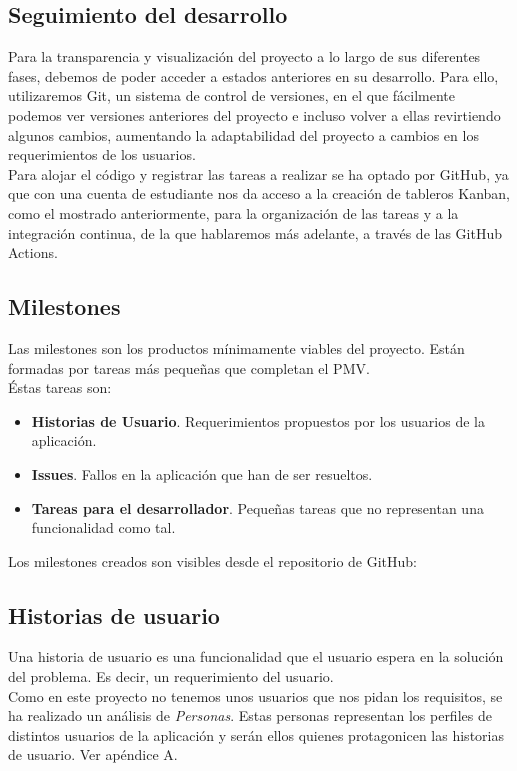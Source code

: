 \subsection{Seguimiento del desarrollo}
Para la transparencia y visualización del proyecto a lo largo de sus diferentes fases, debemos de poder acceder a estados anteriores en su desarrollo. Para ello, utilizaremos Git, un sistema de control de versiones, en el que fácilmente podemos ver versiones anteriores del proyecto e incluso volver a ellas revirtiendo algunos cambios, aumentando la adaptabilidad del proyecto a cambios en los requerimientos de los usuarios.\\

Para alojar el código y registrar las tareas a realizar se ha optado por GitHub, ya que con una cuenta de estudiante nos da acceso a la creación de tableros Kanban, como el mostrado anteriormente, para la organización de las tareas y a la integración continua, de la que hablaremos más adelante, a través de las GitHub Actions.

\subsection{Milestones}
Las milestones son los productos mínimamente viables del proyecto. Están formadas por tareas más pequeñas que completan el PMV.\\

Éstas tareas son:
\begin{itemize}
    \item \textbf{Historias de Usuario}. Requerimientos propuestos por los usuarios de la aplicación.
    \item \textbf{Issues}. Fallos en la aplicación que han de ser resueltos.
    \item \textbf{Tareas para el desarrollador}. Pequeñas tareas que no representan una funcionalidad como tal.
\end{itemize}

Los milestones creados son visibles desde el repositorio de GitHub:

\subsection{Historias de usuario}
Una historia de usuario es una funcionalidad que el usuario espera en la solución del problema. Es decir, un requerimiento del usuario.\\


Como en este proyecto no tenemos unos usuarios que nos pidan los requisitos, se ha realizado un análisis de \textit{Personas}\cite{personas}. Estas personas representan los perfiles de distintos usuarios de la aplicación y serán ellos quienes protagonicen las historias de usuario. Ver apéndice A.

